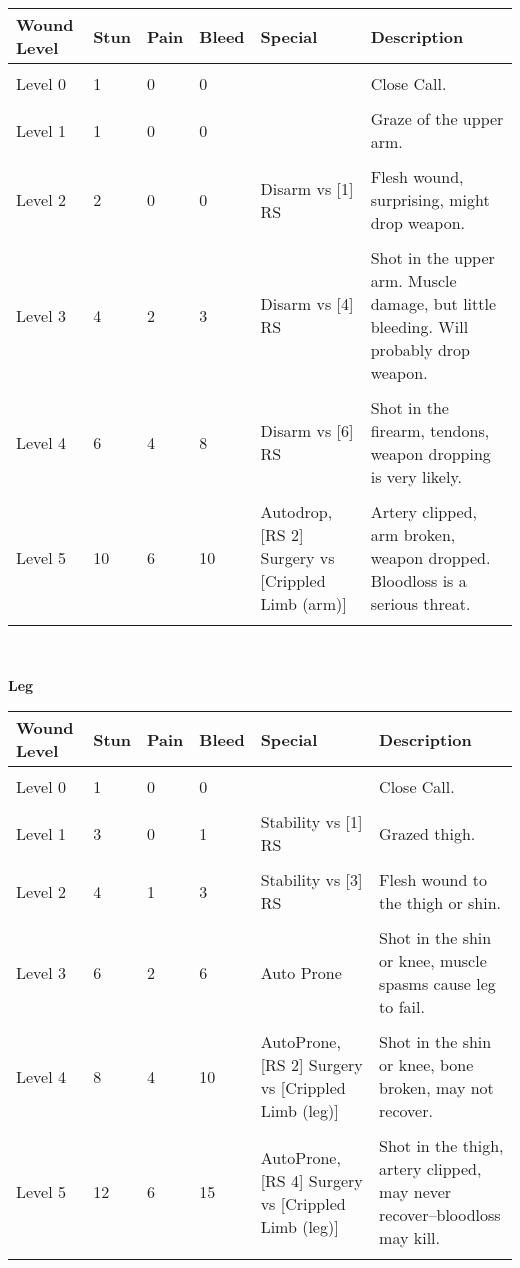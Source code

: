 \documentclass[a4paper, twocolumn, openany]{book}
\begin{document}
{{{\centering
\begin{tabular}{llllp{3cm}p{7cm}}
Wound Level 	& Stun 	& Pain 	& Bleed 	& Special 											& Description \\ \hline \\
Level 0 		& 1 	& 0 	& 0 		&													& Close Call. \\ \\
Level 1 		& 1 	& 0 	& 0 		&													& Graze of the upper arm. \\ \\
Level 2 		& 2 	& 0 	& 0 		& Disarm vs [1] RS									& Flesh wound, surprising, might drop weapon. \\ \\
Level 3 		& 4 	& 2 	& 3 		& Disarm vs [4] RS									& Shot in the upper arm. Muscle damage, but little bleeding. Will probably drop weapon. \\ \\
Level 4 		& 6 	& 4 	& 8 		& Disarm vs [6] RS									& Shot in the firearm, tendons, weapon dropping is very likely. \\ \\
Level 5 		& 10 	& 6 	& 10 		& Autodrop, [RS 2] Surgery vs [Crippled Limb (arm)]	& Artery clipped, arm broken, weapon dropped. Bloodloss is a serious threat. \\ 
\\ \hline
\end{tabular}\\[\baselineskip] }

{\bfseries Leg\\}

{\centering
\begin{tabular}{llllp{3cm}p{7cm}}
Wound Level 	& Stun 	& Pain 	& Bleed 	& Special 											& Description \\ \hline \\
Level 0 		& 1 	& 0 	& 0 		& 													& Close Call. \\ \\
Level 1 		& 3 	& 0 	& 1 		& Stability vs [1] RS								& Grazed thigh. \\ \\
Level 2 		& 4 	& 1 	& 3 		& Stability vs [3] RS								& Flesh wound to the thigh or shin. \\ \\
Level 3 		& 6 	& 2 	& 6 		& Auto Prone										& Shot in the shin or knee, muscle spasms cause leg to fail. \\ \\
Level 4 		& 8 	& 4 	& 10 		& AutoProne, [RS 2] Surgery vs [Crippled Limb (leg)]& Shot in the shin or knee, bone broken, may not recover. \\ \\
Level 5 		& 12 	& 6 	& 15 		& AutoProne, [RS 4] Surgery vs [Crippled Limb (leg)]& Shot in the thigh, artery clipped, may never recover--bloodloss may kill. \\ 
\\ \hline
\end{tabular}\\[\baselineskip] }

}}
\end{document}

